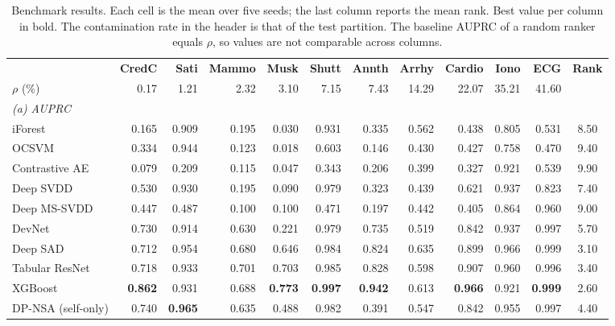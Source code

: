 
\begin{table}[!htbp]
\centering
\caption{Benchmark results. Each cell is the mean over five seeds; the last column reports the mean rank. Best value per column in bold. The contamination rate in the header is that of the test partition. The baseline AUPRC of a random ranker equals $\rho$, so values are not comparable across columns.}
\label{tab:benchmark}
\footnotesize
\setlength{\tabcolsep}{3.2pt}
\begin{tabular}{lrrrrrrrrrrc}
\toprule
 & \textbf{CredC} & \textbf{Sati} & \textbf{Mammo} & \textbf{Musk} & \textbf{Shutt} & \textbf{Annth} & \textbf{Arrhy} & \textbf{Cardio} & \textbf{Iono} & \textbf{ECG} & \textbf{Rank} \\
$\rho$ (\%) & 0.17 & 1.21 & 2.32 & 3.10 & 7.15 & 7.43 & 14.29 & 22.07 & 35.21 & 41.60 & \\
\midrule
\multicolumn{12}{l}{\textit{(a) AUPRC}} \\
\midrule
iForest & 0.165 & 0.909 & 0.195 & 0.030 & 0.931 & 0.335 & 0.562 & 0.438 & 0.805 & 0.531 & 8.50 \\
OCSVM & 0.334 & 0.944 & 0.123 & 0.018 & 0.603 & 0.146 & 0.430 & 0.427 & 0.758 & 0.470 & 9.40 \\
Contrastive AE & 0.079 & 0.209 & 0.115 & 0.047 & 0.343 & 0.206 & 0.399 & 0.327 & 0.921 & 0.539 & 9.90 \\
Deep SVDD & 0.530 & 0.930 & 0.195 & 0.090 & 0.979 & 0.323 & 0.439 & 0.621 & 0.937 & 0.823 & 7.40 \\
Deep MS-SVDD & 0.447 & 0.487 & 0.100 & 0.100 & 0.471 & 0.197 & 0.442 & 0.405 & 0.864 & 0.960 & 9.00 \\
DevNet & 0.730 & 0.914 & 0.630 & 0.221 & 0.979 & 0.735 & 0.519 & 0.842 & 0.937 & 0.997 & 5.70 \\
Deep SAD & 0.712 & 0.954 & 0.680 & 0.646 & 0.984 & 0.824 & 0.635 & 0.899 & 0.966 & 0.999 & 3.10 \\
Tabular ResNet & 0.718 & 0.933 & 0.701 & 0.703 & 0.985 & 0.828 & 0.598 & 0.907 & 0.960 & 0.996 & 3.40 \\
XGBoost & \textbf{0.862} & 0.931 & 0.688 & \textbf{0.773} & \textbf{0.997} & \textbf{0.942} & 0.613 & \textbf{0.966} & 0.921 & \textbf{0.999} & 2.60 \\
DP-NSA (self-only) & 0.740 & \textbf{0.965} & 0.635 & 0.488 & 0.982 & 0.391 & 0.547 & 0.842 & 0.955 & 0.997 & 4.40 \\

\end{tabular}
\end{table}
